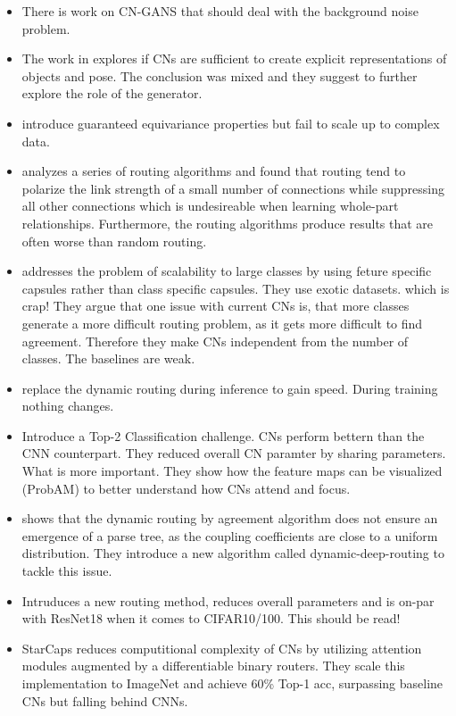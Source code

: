 \documentclass{article}
\begin{document}
\begin{itemize}
	\item There is work on CN-GANS that should deal with the background noise problem. \cite{corr/Marusaki2020}
	\item The work in \cite{corr/Smith2020} explores if CNs are sufficient to create explicit representations of objects and pose. The conclusion was mixed and they suggest to further explore the role of the generator.
	\item \cite{DBLP:conf/nips/LenssenFL18} introduce guaranteed equivariance properties but fail to scale up to complex data.
	\item \cite{acml/PaikKK19} analyzes a series of routing algorithms and found that routing tend to polarize the link strength of a small number of connections while suppressing all other connections which is undesireable when learning whole-part relationships. Furthermore, the routing algorithms produce results that are often worse than random routing.
	\item \cite{corr/Mandal2019} addresses the problem of scalability to large classes by using feture specific capsules rather than class specific capsules. They use exotic datasets. which is crap! They argue that one issue with current CNs is, that more classes generate a more difficult routing problem, as it gets more difficult to find agreement. Therefore they make CNs independent from the number of classes. The baselines are weak.
	\item \cite{corr/Zhao2019} replace the dynamic routing during inference to gain speed. During training nothing changes.
	\item \cite{corr/Ren2019} Introduce a Top-2 Classification challenge. CNs perform bettern than the CNN counterpart. They reduced overall CN paramter by sharing parameters. What is more important. They show how the feature maps can be visualized (ProbAM) to better understand how CNs attend and focus.
	\item \cite{corr/Peer2018} shows that the dynamic routing by agreement algorithm does not ensure an emergence of a parse tree, as the coupling coefficients are close to a uniform distribution. They introduce a new algorithm called dynamic-deep-routing to tackle this issue.
	\item \cite{iclr/TsaiSGS20} Intruduces a new routing method, reduces overall parameters and is on-par with ResNet18 when it comes to CIFAR10/100. This should be read!
	\item StarCaps \cite{nips/AhmedT19} reduces computitional complexity of CNs by utilizing attention modules augmented by a differentiable binary routers. They scale this implementation to ImageNet and achieve 60\% Top-1 acc, surpassing baseline CNs but falling behind CNNs.

\end{itemize}
\end{document}
